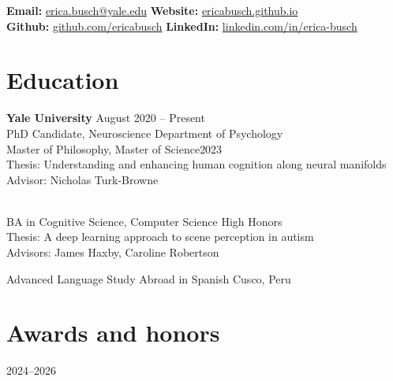 \documentclass[letterpaper, 10pt]{article}
\begin{document}


\begin{table}[h]%
\textbf{Email:} \href{erica.busch@yale.edu}{erica.busch@yale.edu}\hfill
\textbf{Website:} \href{https://ericabusch.github.io/}{ericabusch.github.io}\\
\textbf{Github:} \href{http://www.github.com/ericabusch}{github.com/ericabusch}\hfill 
\textbf{LinkedIn:} \href{http://www.linkedin.com/in/erica-busch}{linkedin.com/in/erica-busch}
\end{table}



\section*{Education}
\textbf{Yale University} \hfill August 2020 -- Present\\ 
PhD Candidate, Neuroscience \hfill Department of Psychology\\
Master of Philosophy, Master of Science\hfill 2023\\
Thesis: Understanding and enhancing human cognition along neural manifolds\\
Advisor: Nicholas Turk-Browne\vspace{0.4cm}

\\
BA in Cognitive Science, Computer Science \hfill High Honors\\
Thesis: A deep learning approach to scene perception in autism\\
Advisors: James Haxby, Caroline Robertson\vspace{0.4cm}

Advanced Language Study Abroad in Spanish \hfill Cusco, Peru

\section*{Awards and honors}

\hfill 2024--2026\\
\vspace{0.2cm}
\end{document}
